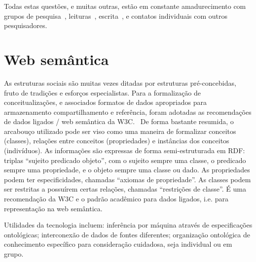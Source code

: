 \documentclass[a4paper,openright,12pt]{report} %
\begin{document}

Todas estas questões, e muitas outras, estão em constante amadurecimento com grupos de pesquisa~\cite{nexos}, 
leituras~\cite{massimoTexto}, escrita~\cite{ensaio,anPhy}, e contatos individuais com outros pesquisadores.

\section{Web semântica}\label{sec:web}
As estruturas sociais são muitas vezes ditadas por estruturas
pré-concebidas, fruto de tradições e esforços especialistas.
Para a formalização de conceitualizações, e associados
formatos de dados apropriados para armazenamento
compartilhamento e referência,
foram adotadas as recomendações de dados ligados / web semântica
da W3C.~\cite{rdf,owl}
De forma bastante resumida, o arcabouço utilizado pode
ser viso como uma maneira de formalizar conceitos (classes), relações
entre conceitos (propriedades) e instâncias dos conceitos (indivíduos).
As informações são expressas de forma semi-estruturada em RDF:
triplas ``sujeito predicado objeto'',
com o sujeito sempre uma classe, o predicado sempre uma propriedade,
e o objeto sempre uma classe ou dado. As propriedades podem ter especificidades, chamadas ``axiomas de propriedade''. As classes podem ser restritas a possuírem certas relações, chamadas ``restrições de classe''.
É uma recomendação da W3C e o padrão acadêmico para dados ligados, i.e. para representação na web semântica.

Utilidades da tecnologia incluem:
    inferência por máquina através de especificações ontológicas;
    interconexão de dados de fontes diferentes;
    organização ontológica de conhecimento específico para consideração cuidadosa, seja individual ou em grupo.
\end{document}
